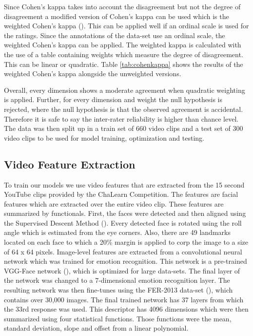Since Cohen's kappa takes into account the disagreement but not the degree of disagreement a modified version of Cohen's kappa can be used which is the weighted Cohen's kappa (\cite{cohen1968weighted}). This can be applied well if an ordinal scale is used for the ratings. Since the annotations of the data-set use an ordinal scale, the weighted Cohen's kappa can be applied. The weighted kappa is calculated with the use of a table containing weights which measure the degree of disagreement. This can be linear or quadratic. Table \ref{tab:cohenkappa} shows the results of the weighted Cohen's kappa alongside the unweighted versions. 

Overall, every dimension shows a moderate agreement when quadratic weighting is applied. Further, for every dimension and weight the null hypothesis is rejected, where the null hypothesis is that the observed agreement is accidental. Therefore it is safe to say the inter-rater reliability is higher than chance level. The data was then split up in a train set of 660 video clips and a test set of 300 video clips to be used for model training, optimization and testing. 

\subsection{Video Feature Extraction}\label{subsection:featureextraction}
To train our models we use video features that are extracted from the 15 second YouTube clips provided by the ChaLearn Competition. The features are facial features which are extracted over the entire video clip. These features are summarized by functionals. First, the faces were detected and then aligned using the Supervised Descent Method (\cite{xiong2013supervised}). Every detected face is rotated using the roll angle which is estimated from the eye corners. Also, there are 49 landmarks located on each face to which a 20\% margin is applied to corp the image to a size of 64 x 64 pixels. Image-level features are extracted from a convolutional neural network which was trained for emotion recognition. This network is a pre-trained VGG-Face network (\cite{kaya2017video}), which is optimized for large data-sets. The final layer of the network was changed to a 7-dimensional emotion recognition layer. The resulting network was then fine-tunes using the FER-2013 data-set (\cite{goodfellow2015challenges}), which contains over 30,000 images. The final trained network has 37 layers from which the 33rd response was used. This descriptor has 4096 dimensions which were then summarized using four statistical functions. Those functions were the mean, standard deviation, slope and offset from a linear polynomial.

